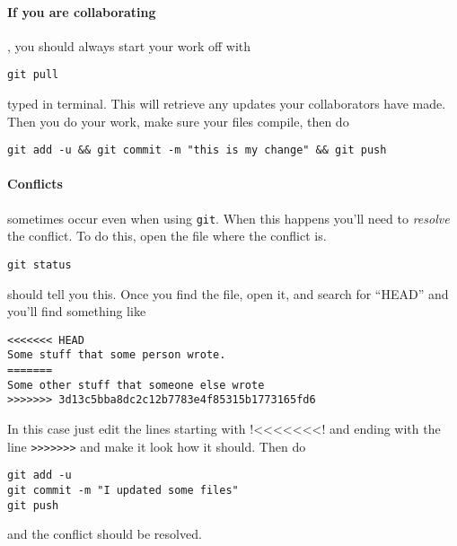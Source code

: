 \documentclass{ximera}
\begin{document}
\paragraph{If you are collaborating}, you should always start your work off
with
\begin{verbatim}
git pull
\end{verbatim}
typed in terminal. This will retrieve any updates your collaborators have made.
Then you do your work, make sure your files compile, then do
\begin{verbatim}
git add -u && git commit -m "this is my change" && git push
\end{verbatim}

\paragraph{Conflicts} sometimes occur even when using \verb!git!. When this
happens you'll need to \textit{resolve} the conflict. To do this, open the file
where the conflict is.
\begin{verbatim}
git status
\end{verbatim}
should tell you this. Once you find the file, open it, and search for ``HEAD'' and you'll find something like
\begin{verbatim}
<<<<<<< HEAD
Some stuff that some person wrote.
=======
Some other stuff that someone else wrote
>>>>>>> 3d13c5bba8dc2c12b7783e4f85315b1773165fd6
\end{verbatim}
In this case just edit the lines starting with !<<<<<<<! and ending with the line \verb!>>>>>>>! and make it look how it should.
Then do
\begin{verbatim}
git add -u
git commit -m "I updated some files"
git push
\end{verbatim}
and the conflict should be resolved.


\end{document}
